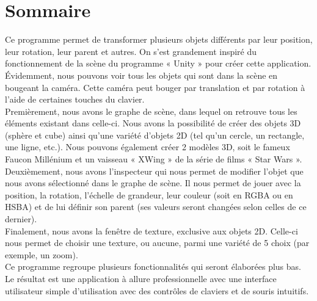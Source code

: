 \section{Sommaire}
\label{s:sommaire}

Ce programme permet de transformer plusieurs objets différents par leur position, leur rotation, leur parent et autres.
On s’est grandement inspiré du fonctionnement de la scène du programme « Unity » pour créer cette application.\\

Évidemment, nous pouvons voir tous les objets qui sont dans la scène en bougeant la caméra.
Cette caméra peut bouger par translation et par rotation à l’aide de certaines touches du clavier.\\

Premièrement, nous avons le graphe de scène, dans lequel on retrouve tous les éléments existant dans celle-ci.
Nous avons la possibilité de créer des objets 3D (sphère et cube) ainsi qu’une variété d’objets 2D (tel qu’un cercle, un rectangle, une ligne, etc.).
Nous pouvons également créer 2 modèles 3D, soit le fameux Faucon Millénium et un vaisseau « XWing » de la série de films « Star Wars ».\\

Deuxièmement, nous avons l’inspecteur qui nous permet de modifier l’objet que nous avons sélectionné dans le graphe de scène.
Il nous permet de jouer avec la position, la rotation, l’échelle de grandeur, leur couleur (soit en RGBA ou en HSBA) et de lui définir son parent (ses valeurs seront changées selon celles de ce dernier). \\

Finalement, nous avons la fenêtre de texture, exclusive aux objets 2D.
Celle-ci nous permet de choisir une texture, ou aucune, parmi une variété de 5 choix (par exemple, un zoom).\\

Ce programme regroupe plusieurs fonctionnalités qui seront élaborées plus bas.
Le résultat est une application à allure professionnelle avec une interface utilisateur simple d’utilisation avec des contrôles de claviers et de souris intuitifs.